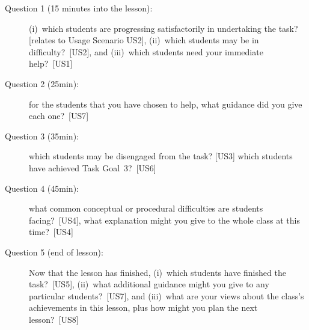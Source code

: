 \begin{description}
\item[Question 1 (15 minutes into the lesson): ] (i)~which
  students are progressing satisfactorily in undertaking the task?
  [relates to Usage Scenario US2], (ii)~which students may be in
  difficulty?~[US2], and (iii)~which students need your immediate
  help?~[US1]
\item[Question 2 (25min): ] for the students that you have chosen to
  help, what guidance did you give each one?~[US7]
\item[Question 3 (35min): ] which students may be disengaged from the
  task? [US3] which students have achieved Task Goal~3?~[US6]
\item[Question 4 (45min): ] what common conceptual or procedural
  difficulties are students facing?~[US4], what explanation might you
  give to the whole class at this time?~[US4]
\item[Question 5 (end of lesson): ] Now that the lesson has finished,
  (i)~which students have finished the task?~[US5], (ii)~what 
  additional guidance might you give to any particular
  students?~[US7], and (iii)~what are your views about the class’s
  achievements in this lesson, plus how might you plan the next
  lesson?~[US8] 
\end{description}



